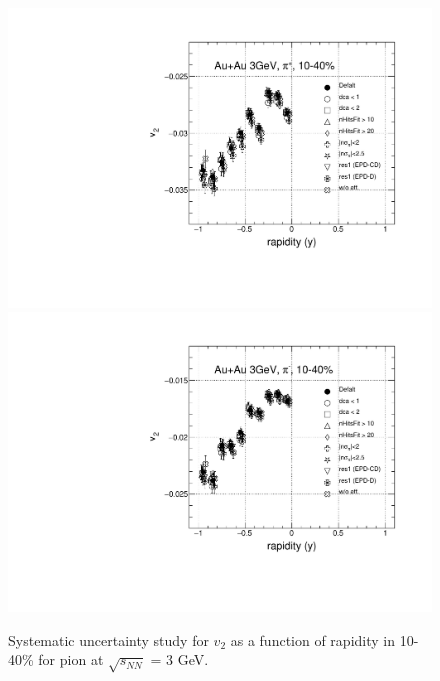 \begin{figure}[h]
\includegraphics[scale=0.4]{chapter3/fig/sys/pion/v2y_pip_sys.pdf}
\includegraphics[scale=0.4]{chapter3/fig/sys/pion/v2y_pim_sys.pdf}
\caption{Systematic uncertainty study for $v_{2}$ as a function of rapidity in 10-40\% for pion at $\sqrt{s_{NN}}$ = 3 GeV.}
\label{pion_v1y_sys}
\end{figure}

